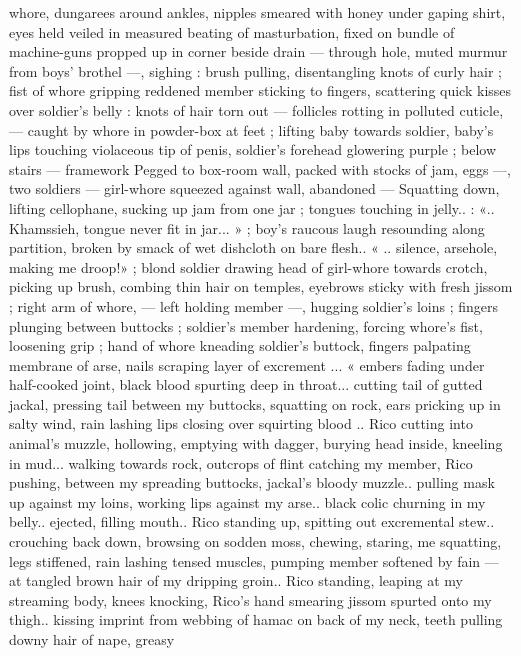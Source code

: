whore, dungarees around ankles, nipples smeared with honey under
gaping shirt, eyes held veiled in measured beating of masturbation,
fixed on bundle of machine-guns propped up in corner beside drain
--- through hole, muted murmur from boys’ brothel ---, sighing :
brush pulling, disentangling knots of curly hair ; fist of whore
gripping reddened member sticking to fingers, scattering quick
kisses over soldier's belly : knots of hair torn out --- follicles rotting
in polluted cuticle, --- caught by whore in powder-box at feet ; lifting
baby towards soldier, baby's lips touching violaceous tip of penis,
soldier's forehead glowering purple ; below stairs --- framework
Pegged to box-room wall, packed with stocks of jam, eggs ---, two
soldiers --- girl-whore squeezed against wall, abandoned ---
Squatting down, lifting cellophane, sucking up jam from one jar ;
tongues touching in jelly.. : «.. Khamssieh, tongue never fit in jar... » ;
boy's raucous laugh resounding along partition, broken by smack of
wet dishcloth on bare flesh.. « .. silence, arsehole, making me
droop!» ; blond soldier drawing head of girl-whore towards crotch,
picking up brush, combing thin hair on temples, eyebrows sticky with
fresh jissom ; right arm of whore, --- left holding member ---,
hugging soldier's loins ; fingers plunging between buttocks ;
soldier's member hardening, forcing whore's fist, loosening grip ;
hand of whore kneading soldier's buttock, fingers palpating
membrane of arse, nails scraping layer of excrement ... « embers
fading under half-cooked joint, black blood spurting deep in throat...
cutting tail of gutted jackal, pressing tail between my buttocks,
squatting on rock, ears pricking up in salty wind, rain lashing lips
closing over squirting blood .. Rico cutting into animal's muzzle,
hollowing, emptying with dagger, burying head inside, kneeling in
mud... walking towards rock, outcrops of flint catching my member,
Rico pushing, between my spreading buttocks, jackal’s bloody
muzzle.. pulling mask up against my loins, working lips against my
arse.. black colic churning in my belly.. ejected, filling mouth.. Rico
standing up, spitting out excremental stew.. crouching back down,
browsing on sodden moss, chewing, staring, me squatting, legs
stiffened, rain lashing tensed muscles, pumping member softened by
fain --- at tangled brown hair of my dripping groin.. Rico standing,
leaping at my streaming body, knees knocking, Rico's hand smearing
jissom spurted onto my thigh.. kissing imprint from webbing of
hamac on back of my neck, teeth pulling downy hair of nape, greasy
